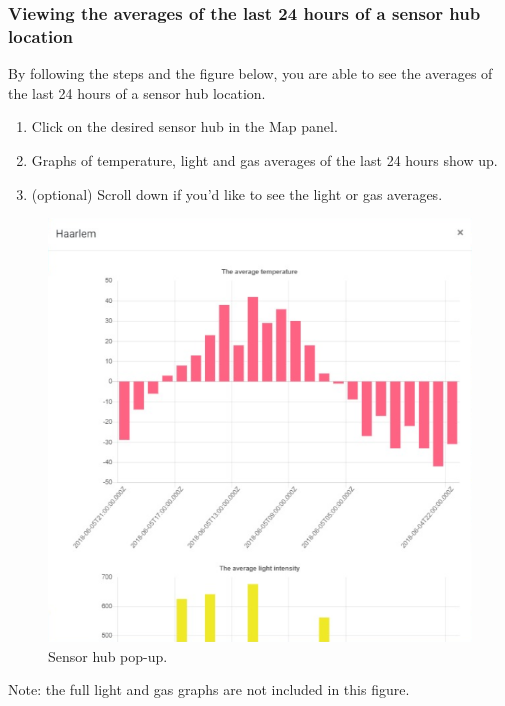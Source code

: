 \documentclass[a4paper]{article}
\begin{document}
\subsubsection*{Viewing the averages of the last 24 hours of a sensor hub location}
By following the steps and the figure below, you are able to see the averages  of the last 24 hours of a sensor hub location.
\begin{enumerate}
\item Click on the desired sensor hub in the Map panel.
\item Graphs of temperature, light and gas averages of the last 24 hours show up.
\item (optional) Scroll down if you'd like to see the light or gas averages.
\end{enumerate}
\begin{figure}[h!]
  \caption{Sensor hub pop-up.}
  \centering
  \includegraphics[width=1\textwidth]{sensorhub-popup}
\end{figure}
Note: the full light and gas graphs are not included in this figure.

\newpage
\end{document}
